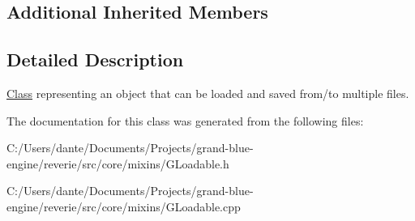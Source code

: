 \subsection*{Additional Inherited Members}


\subsection{Detailed Description}
\mbox{\hyperlink{struct_class}{Class}} representing an object that can be loaded and saved from/to multiple files. 

The documentation for this class was generated from the following files\+:\begin{DoxyCompactItemize}
\item 
C\+:/\+Users/dante/\+Documents/\+Projects/grand-\/blue-\/engine/reverie/src/core/mixins/G\+Loadable.\+h\item 
C\+:/\+Users/dante/\+Documents/\+Projects/grand-\/blue-\/engine/reverie/src/core/mixins/G\+Loadable.\+cpp\end{DoxyCompactItemize}
